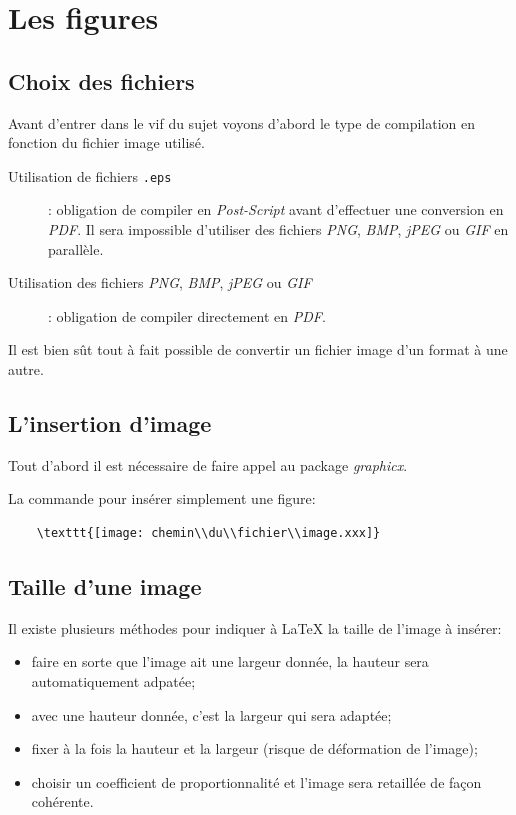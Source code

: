 
\chapter{Les figures}
\section{Choix des fichiers}
Avant d'entrer dans le vif du sujet voyons d'abord le type de compilation en fonction du fichier image utilisé.
\begin{description}
	\item[Utilisation de fichiers \texttt{.eps}]: obligation de compiler en \textit{Post-Script} avant d'effectuer une conversion en \textit{PDF}. Il sera impossible d'utiliser des fichiers \textit{PNG}, \textit{BMP}, \textit{jPEG} ou \textit{GIF} en parallèle.
	\item[Utilisation des fichiers \textit{PNG}, \textit{BMP}, \textit{jPEG} ou \textit{GIF}]: obligation de compiler directement en \textit{PDF}.
\end{description}
\medskip

Il est bien sût tout à fait possible de convertir un fichier image d'un format à une autre.
\medskip

\section{L'insertion d'image}
Tout d'abord il est nécessaire de faire appel au package \textit{graphicx}.
\medskip

La commande pour insérer simplement une figure:
\begin{verbatim}
    \texttt{[image: chemin\\du\\fichier\\image.xxx]}
\end{verbatim}
\medskip

\section{Taille d'une image}
Il existe plusieurs méthodes pour indiquer à \LaTeX{} la taille de l'image à insérer:
\begin{itemize}
	\item faire en sorte que l'image ait une largeur donnée, la hauteur sera automatiquement adpatée;
	\item avec une hauteur donnée, c'est la largeur qui sera adaptée;
	\item fixer à la fois la hauteur et la largeur (risque de déformation de l'image);
	\item choisir un coefficient de proportionnalité et l'image sera \og retaillée\fg{} de façon cohérente.
\end{itemize}
\medskip

